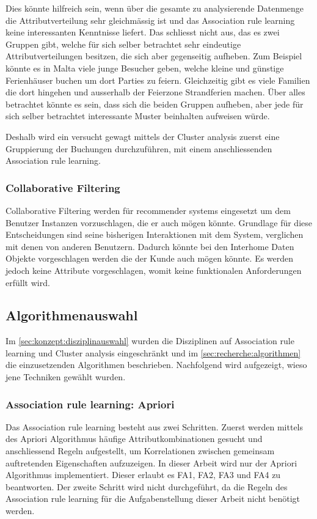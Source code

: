 Dies könnte hilfreich sein, wenn über die gesamte zu analysierende Datenmenge die Attributverteilung sehr gleichmässig ist und das Association rule learning keine interessanten Kenntnisse liefert. Das schliesst nicht aus, das es zwei Gruppen gibt, welche für sich selber betrachtet sehr eindeutige Attributverteilungen besitzen, die sich aber gegenseitig aufheben. Zum Beispiel könnte es in Malta viele junge Besucher geben, welche kleine und günstige Ferienhäuser buchen um dort Parties zu feiern. Gleichzeitig gibt es viele Familien die dort hingehen und ausserhalb der Feierzone Strandferien machen. Über alles betrachtet könnte es sein, dass sich die beiden Gruppen aufheben, aber jede für sich selber betrachtet interessante Muster beinhalten aufweisen würde.

Deshalb wird ein versucht gewagt mittels der Cluster analysis zuerst eine Gruppierung der Buchungen durchzuführen, mit einem anschliessenden Association rule learning.

\subsubsection{Collaborative Filtering}
\label{sec:konzept:disziplinauswahl:collaborativefiltering}
Collaborative Filtering werden für recommender systems eingesetzt um dem Benutzer Instanzen vorzuschlagen, die er auch mögen könnte. Grundlage für diese Entscheidungen sind seine bisherigen Interaktionen mit dem System, verglichen mit denen von anderen Benutzern. Dadurch könnte bei den Interhome Daten Objekte vorgeschlagen werden die der Kunde auch mögen könnte. Es werden jedoch keine Attribute vorgeschlagen, womit keine funktionalen Anforderungen erfüllt wird.

\subsection{Algorithmenauswahl}
\label{sec:konzept:algorithmenauswahl}
Im \cref{sec:konzept:disziplinauswahl} wurden die Disziplinen auf Association rule learning und Cluster analysis eingeschränkt und im \cref{sec:recherche:algorithmen} die einzusetzenden Algorithmen beschrieben. Nachfolgend wird aufgezeigt, wieso jene Techniken gewählt wurden.

\subsubsection{Association rule learning: Apriori}
\label{sec:konzept:algorithmenauswahl:apriori}
Das Association rule learning besteht aus zwei Schritten. Zuerst werden mittels des Apriori Algorithmus häufige Attributkombinationen gesucht und anschliessend Regeln aufgestellt, um Korrelationen zwischen gemeinsam auftretenden Eigenschaften aufzuzeigen.
In dieser Arbeit wird nur der Apriori Algorithmus implementiert. Dieser erlaubt es FA1, FA2, FA3 und FA4 zu beantworten. Der zweite Schritt wird nicht durchgeführt, da die Regeln des Association rule learning für die Aufgabenstellung dieser Arbeit nicht benötigt werden.

